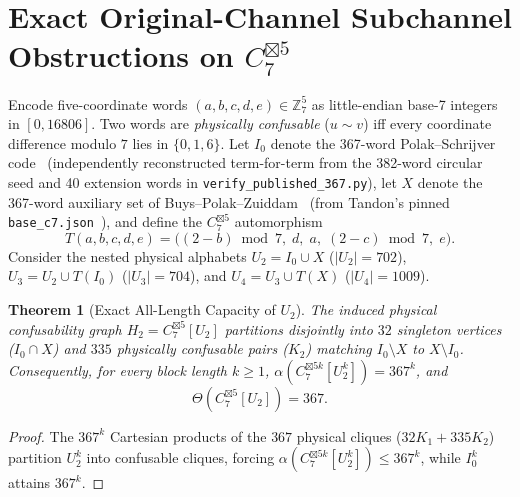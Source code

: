 \documentclass[11pt,letterpaper]{article}
\newtheorem{theorem}{Theorem}[section]
\theoremstyle{definition}
\theoremstyle{remark}
\newcommand{\ThetaCap}{\Theta}
\newcommand{\Z}{\mathbb{Z}}
\begin{document}
\section{Exact Original-Channel Subchannel Obstructions on $C_7^{\boxtimes 5}$}
Encode five-coordinate words $(a,b,c,d,e) \in \Z_7^5$ as little-endian base-7 integers in $[0,16806]$. Two words are \emph{physically confusable} ($u \sim v$) iff every coordinate difference modulo $7$ lies in $\{0,1,6\}$. Let $I_0$ denote the 367-word Polak--Schrijver code~\cite{PolakSchrijver2019} (independently reconstructed term-for-term from the 382-word circular seed and 40 extension words in \texttt{verify\_published\_367.py}), let $X$ denote the 367-word auxiliary set of Buys--Polak--Zuiddam~\cite{BPZ2026} (from Tandon's pinned \texttt{base\_c7.json}~\cite{Tandon2026}), and define the $C_7^{\boxtimes 5}$ automorphism
\[
  T(a,b,c,d,e) = \bigl((2-b)\bmod 7,\; d,\; a,\; (2-c)\bmod 7,\; e\bigr).
\]
Consider the nested physical alphabets $U_2 = I_0 \cup X$ ($|U_2|=702$), $U_3 = U_2 \cup T(I_0)$ ($|U_3|=704$), and $U_4 = U_3 \cup T(X)$ ($|U_4|=1009$).

\begin{theorem}[Exact All-Length Capacity of $U_2$]\label{thm:u2}
The induced physical confusability graph $H_2 = C_7^{\boxtimes 5}[U_2]$ partitions disjointly into $32$ singleton vertices ($I_0 \cap X$) and $335$ physically confusable pairs ($K_2$) matching $I_0 \setminus X$ to $X \setminus I_0$. Consequently, for every block length $k \ge 1$, $\alpha(C_7^{\boxtimes 5k}[U_2^k]) = 367^k$, and
\[
  \ThetaCap(C_7^{\boxtimes 5}[U_2]) = 367.
\]
\end{theorem}
\begin{proof}
The $367^k$ Cartesian products of the $367$ physical cliques ($32K_1 + 335K_2$) partition $U_2^k$ into confusable cliques, forcing $\alpha(C_7^{\boxtimes 5k}[U_2^k]) \le 367^k$, while $I_0^k$ attains $367^k$.
\end{proof}
\end{document}
